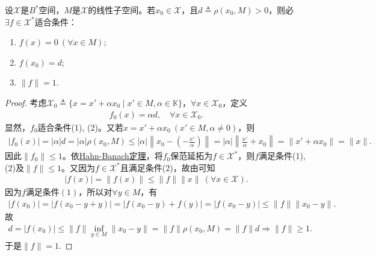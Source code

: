 \documentclass[../../main.tex]{subfiles}%
\begin{document}
\begin{theorem}\label{theorem:泛函分析--零值泛函延拓定理}
设$\mathscr{X}$是$B^*$空间，$M$是$\mathscr{X}$的线性子空间。若$x_0 \in \mathscr{X}$，且$d \triangleq \rho(x_0, M) > 0$，则必$\exists f \in \mathscr{X}^*$适合条件：
\begin{enumerate}[(1)]
\item $f(x) = 0 \ (\forall x \in M)$;
\item $f(x_0) = d$;
\item $\|f\| = 1$.
\end{enumerate}
\end{theorem}
\begin{proof}

考虑$\mathscr{X}_0 \triangleq \{x = x' + \alpha x_0 \mid x' \in M, \alpha \in \mathbb{K}\}$，$\forall x \in \mathscr{X}_0$，定义
\begin{align*}
f_0(x) = \alpha d,\quad \forall x\in \mathscr{X}_0.
\end{align*}
显然，$f_0$适合条件(1), (2)。又若$x = x' + \alpha x_0 \ (x' \in M, \alpha \neq 0)$，则
\begin{align*}
|f_0(x)|=|\alpha |d=|\alpha |\rho (x_0,M)\leqslant |\alpha |\left\| x_0-\left( -\frac{x\prime}{\alpha} \right) \right\| =|\alpha |\left\| \frac{x\prime}{\alpha}+x_0 \right\| =\parallel x\prime +\alpha x_0\parallel =\parallel x\parallel .
\end{align*}
因此$\|f_0\| \leqslant 1$。依\hyperref[theorem:泛函分析--(哈恩-巴拿赫)Hahn-Banach定理]{Hahn-Banach定理}，将$f_0$保范延拓为$f \in \mathscr{X}^*$，则$f$满足条件(1), (2)及$\|f\| \leqslant 1$。又因为$f \in \mathscr{X}^*$且满足条件(2)，故由可知
\begin{align*}
|f(x)| = \| f(x) \| \leqslant \| f \| \| x \| \ (\forall x\in \mathscr{X}).
\end{align*}
因为$f$满足条件$(1)$，所以对$\forall y\in M$，有
\begin{align*}
|f(x_0)| = |f(x_0-y+y)| = |f(x_0-y)+f(y)| = |f(x_0-y)| \leqslant \| f \| \| x_0-y \|.
\end{align*}
故
\begin{align*}
d = |f(x_0)| \leqslant \| f \| \inf\limits_{y\in M} \| x_0-y \| = \| f \| \rho(x_0,M) = \| f \| d \Longrightarrow \| f \| \geqslant 1.
\end{align*}
于是$\|f\| = 1$.

\end{proof}
\end{document}
